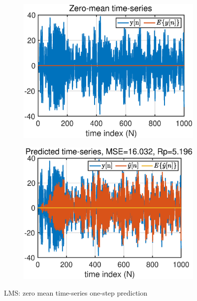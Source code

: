 \begin{figure}[htb]
     \centering
     \hspace{0.4cm}
     \begin{subfigure}[b]{0.4\textwidth}
         \centering
         \includegraphics[width=\textwidth]{fig/4/41a1.eps}
     \end{subfigure}
    \hspace{0.4cm}
     \begin{subfigure}[b]{0.4\textwidth}
         \centering
         \includegraphics[width=\textwidth]{fig/4/41a2.eps}
     \end{subfigure}
     \caption{LMS: zero mean time-series one-step prediction}
     \label{fig:4_1_a}
\end{figure}
